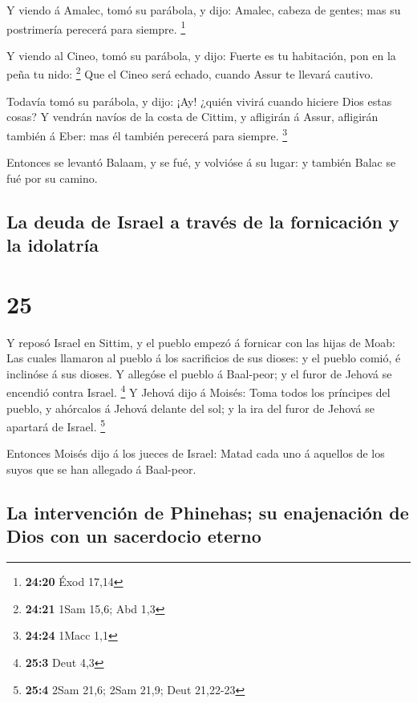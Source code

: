  Y viendo á Amalec, tomó su parábola, y dijo: Amalec,
cabeza de gentes; mas su postrimería perecerá para siempre. \footnote{\textbf{24:20}
  Éxod 17,14}

 Y viendo al Cineo, tomó su parábola, y dijo: Fuerte es tu
habitación, pon en la peña tu nido: \footnote{\textbf{24:21} 1Sam 15,6;
  Abd 1,3}  Que el Cineo será echado, cuando Assur te
llevará cautivo.

 Todavía tomó su parábola, y dijo: ¡Ay! ¿quién vivirá
cuando hiciere Dios estas cosas?  Y vendrán navíos de la
costa de Cittim, y afligirán á Assur, afligirán también á Eber: mas él
también perecerá para siempre. \footnote{\textbf{24:24} 1Macc 1,1}

 Entonces se levantó Balaam, y se fué, y volvióse á su
lugar: y también Balac se fué por su camino.

\hypertarget{la-deuda-de-israel-a-travuxe9s-de-la-fornicaciuxf3n-y-la-idolatruxeda}{%
\subsection{La deuda de Israel a través de la fornicación y la
idolatría}\label{la-deuda-de-israel-a-travuxe9s-de-la-fornicaciuxf3n-y-la-idolatruxeda}}

\hypertarget{section-24}{%
\section{25}\label{section-24}}

 Y reposó Israel en Sittim, y el pueblo empezó á fornicar
con las hijas de Moab:  Las cuales llamaron al pueblo á los
sacrificios de sus dioses: y el pueblo comió, é inclinóse á sus dioses.
 Y allegóse el pueblo á Baal-peor; y el furor de Jehová se
encendió contra Israel. \footnote{\textbf{25:3} Deut 4,3}  Y
Jehová dijo á Moisés: Toma todos los príncipes del pueblo, y ahórcalos á
Jehová delante del sol; y la ira del furor de Jehová se apartará de
Israel. \footnote{\textbf{25:4} 2Sam 21,6; 2Sam 21,9; Deut 21,22-23}

 Entonces Moisés dijo á los jueces de Israel: Matad cada uno
á aquellos de los suyos que se han allegado á Baal-peor.

\hypertarget{la-intervenciuxf3n-de-phinehas-su-enajenaciuxf3n-de-dios-con-un-sacerdocio-eterno}{%
\subsection{La intervención de Phinehas; su enajenación de Dios con un
sacerdocio
eterno}\label{la-intervenciuxf3n-de-phinehas-su-enajenaciuxf3n-de-dios-con-un-sacerdocio-eterno}}

